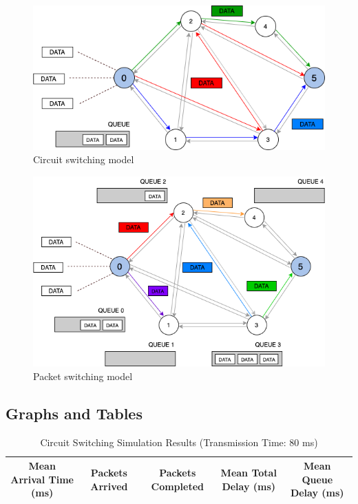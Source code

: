 \documentclass{article}
\begin{document}
    \begin{figure}[h]
  \centering
          \includegraphics[totalheight=5.5cm]{images/graph_cs.png}
  \renewcommand\figurename{Figure}
      \caption{Circuit switching model}
      \label{fig:graph_cs}
  \end{figure}

      \begin{figure}[h]
  \centering
          \includegraphics[totalheight=8cm]{images/graph_ps.png}
  \renewcommand\figurename{Figure}
      \caption{Packet switching model}
      \label{fig:graph_ps}
  \end{figure}
  

  \subsection{Graphs and Tables}

  \begin{table}[h]
    \caption{Circuit Switching Simulation Results (Transmission Time: 80 ms)}
    \centering
    {\footnotesize
      \begin{tabular}{|c|c|c|c|c|}
        \hline
          Mean Arrival Time (ms) & Packets Arrived & Packets Completed & Mean Total Delay (ms)
          & Mean Queue Delay (ms)\\
        \hline
      \end{tabular}
    }
  \end{table}
\end{document}
